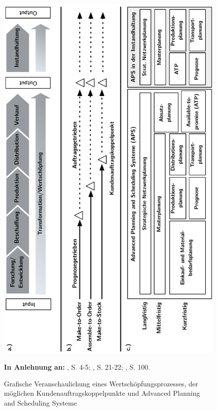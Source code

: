 \begin{figure}[h!]
  \begin{center}
    \includegraphics[width=120mm]{Bilder/prozess.pdf}
    \caption{Grafische Veranschaulichung eines Wertschöpfungsprozesses, der möglichen Kundenauftragskoppelpunkte und Advanced Planning and Scheduling Systeme}  \label{Prozess}
    {\footnotesize \textbf{In Anlehnung an:} \cite{Bach:2012aa}, S. 4-5; \cite{quante2009management}, S. 21-22; \cite{meyr2015structure}, S. 100.}
  \end{center}
\end{figure}

